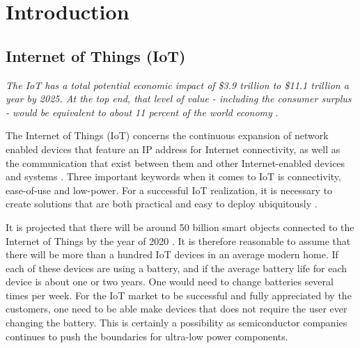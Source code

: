 \chapter{Introduction}

\section{Internet of Things (IoT)}

\textit{The IoT has a total potential economic impact of \$3.9 trillion to \$11.1 trillion a year by 2025. At the top end, that level of value - including the consumer surplus - would be equivalent to about 11 percent of the world economy} \cite{mckinsey15}.





The Internet of Things (IoT) concerns the continuous expansion of network enabled devices that feature an IP address for Internet connectivity, as well as the communication that exist between them and other Internet-enabled devices and systems \cite{webopedia}. Three important keywords when it comes to IoT is connectivity, ease-of-use and low-power. For a successful IoT realization, it is necessary to create solutions that are both practical and easy to deploy ubiquitously \cite{embedded_IoT}. %


It is projected that there will be around 50 billion smart objects connected to the Internet of Things by the year of 2020 \cite{jayakumar14}. It is therefore reasonable to assume that there will be more than a hundred IoT devices in an average modern home. If each of these devices are using a battery, and if the average battery life for each device is about one or two years. One would need to change batteries several times per week. For the IoT market to be successful and fully appreciated by the customers, one need to be able make devices that does not require the user ever changing the battery. This is certainly a possibility as semiconductor companies continues to push the boundaries for ultra-low power components.  

